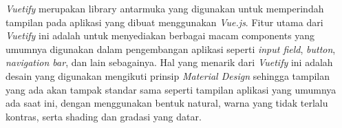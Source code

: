 \emph{Vuetify} merupakan library antarmuka yang digunakan untuk memperindah tampilan pada aplikasi yang dibuat menggunakan \emph{Vue.js}.
Fitur utama dari \emph{Vuetify} ini adalah untuk menyediakan berbagai macam components yang umumnya digunakan dalam pengembangan aplikasi seperti \emph{input field}, \emph{button}, \emph{navigation bar}, dan lain sebagainya.
Hal yang menarik dari \emph{Vuetify} ini adalah desain yang digunakan mengikuti prinsip \emph{Material Design} sehingga tampilan yang ada akan tampak standar sama seperti tampilan aplikasi yang umumnya ada saat ini, dengan menggunakan bentuk natural, warna yang tidak terlalu kontras, serta shading dan gradasi yang datar.
\vspace{0.5ex}
